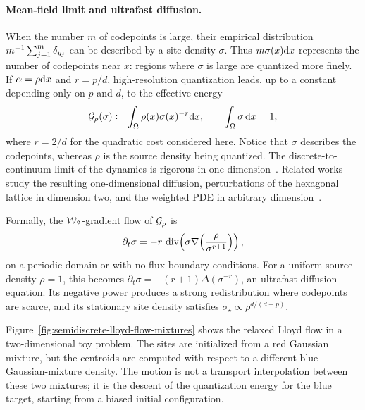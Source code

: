 \paragraph{Mean-field limit and ultrafast diffusion.}
When the number \(m\) of codepoints is large, their empirical distribution
\(
m^{-1}\sum_{j=1}^m\delta_{y_j}
\)
can be described by a site density \(\sigma\). Thus \(m\sigma(x)\mathrm{d} x\) represents the number of codepoints near \(x\): regions where \(\sigma\) is large are quantized more finely. If \(\alpha=\rho\mathrm{d} x\) and \(r=p/d\), high-resolution quantization leads, up to a constant depending only on \(p\) and \(d\), to the effective energy~\cite{graf2000foundationsquantization}
\[
	\mathcal{G}_\rho(\sigma)
	\coloneqq
	\int_\Omega \rho(x) \sigma(x)^{-r}\mathrm{d} x,
	\qquad
	\int_\Omega \sigma\,\mathrm{d} x=1,
\]
where \(r=2/d\) for the quadratic cost considered here. Notice that \(\sigma\) describes the codepoints, whereas \(\rho\) is the source density being quantized. The discrete-to-continuum limit of the dynamics is rigorous in one dimension~\cite{caglioti2015gradient}. Related works study the resulting one-dimensional diffusion, perturbations of the hexagonal lattice in dimension two, and the weighted PDE in arbitrary dimension~\cite{iacobelli2019asymptotic,caglioti2018quantization2d,iacobelli2019weighted}.

Formally, the \(\operatorname{\mathcal{W}}_2\)-gradient flow of \(\mathcal{G}_\rho\) is
\[
	\partial_t \sigma
	=
	-r\,\operatorname{div}\!\left(
	\sigma\nabla\!\left(\frac{\rho}{\sigma^{r+1}}\right)
	\right),
\]
on a periodic domain or with no-flux boundary conditions. For a uniform source density \(\rho=1\), this becomes \(\partial_t\sigma=-(r+1)\Delta(\sigma^{-r})\), an ultrafast-diffusion equation. Its negative power produces a strong redistribution where codepoints are scarce, and its stationary site density satisfies \(\sigma_\star\propto\rho^{d/(d+p)}\).

Figure~\ref{fig:semidiscrete-lloyd-flow-mixtures} shows the relaxed Lloyd flow in a two-dimensional toy problem. The sites are initialized from a red Gaussian mixture, but the centroids are computed with respect to a different blue Gaussian-mixture density. The motion is not a transport interpolation between these two mixtures; it is the descent of the quantization energy for the blue target, starting from a biased initial configuration.

